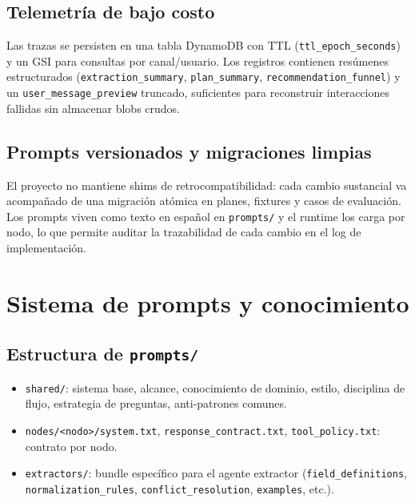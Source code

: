 \documentclass[11pt,a4paper]{article}
\begin{document}
\subsection{Telemetría de bajo costo}

Las trazas se persisten en una tabla DynamoDB con TTL
(\texttt{ttl\_epoch\_seconds}) y un GSI para consultas por canal/usuario.
Los registros contienen resúmenes estructurados (\texttt{extraction\_summary},
\texttt{plan\_summary}, \texttt{recommendation\_funnel}) y un
\texttt{user\_message\_preview} truncado, suficientes para reconstruir
interacciones fallidas sin almacenar blobs crudos.

\subsection{Prompts versionados y migraciones limpias}

El proyecto no mantiene shims de retrocompatibilidad: cada cambio
sustancial va acompañado de una migración atómica en planes, fixtures
y casos de evaluación. Los prompts viven como texto en español en
\texttt{prompts/} y el runtime los carga por nodo, lo que permite
auditar la trazabilidad de cada cambio en el log de implementación.

\section{Sistema de prompts y conocimiento}

\subsection{Estructura de \texttt{prompts/}}

\begin{itemize}[leftmargin=*,itemsep=1pt]
  \item \texttt{shared/}: sistema base, alcance, conocimiento de
        dominio, estilo, disciplina de flujo, estrategia de preguntas,
        anti-patrones comunes.
  \item \texttt{nodes/<nodo>/system.txt}, \texttt{response\_contract.txt},
        \texttt{tool\_policy.txt}: contrato por nodo.
  \item \texttt{extractors/}: bundle específico para el agente extractor
        (\texttt{field\_definitions}, \texttt{normalization\_rules},
        \texttt{conflict\_resolution}, \texttt{examples}, etc.).
\end{itemize}
\end{document}
